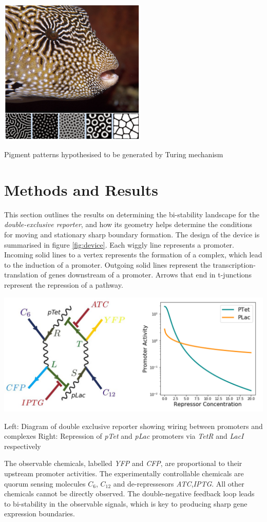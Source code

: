 \begin{Figure}
\includegraphics[width=70mm]{figures/turing.png}
\caption{Pigment patterns hypothesised to be generated by Turing mechanism}
\label{fig:turing}
\end{Figure}

\section{Methods and Results}
This section outlines the results on determining the bi-stability landscape for the
\textit{double-exclusive reporter}, and how its geometry helps determine the conditions for
moving and stationary sharp boundary formation. The design of the device is summarised 
in figure \ref{fig:device}. Each wiggly line represents a promoter. Incoming solid lines
to a vertex represents the formation of a complex, which lead to the induction of a promoter.
Outgoing solid lines represent the transcription-translation of genes downstream of a
promoter. Arrows that end in t-junctions represent the repression of a pathway.

\begin{Figure}
\includegraphics[width=140mm]{figures/device.png}
\caption{Left: Diagram of double exclusive reporter showing wiring between promoters
and complexes Right: Repression of \textit{pTet} and \textit{pLac} promoters via
\textit{TetR} and \textit{LacI} respectively}
\label{fig:device}
\end{Figure}
\noindent
The observable chemicals, labelled \textit{YFP} and \textit{CFP}, are
proportional to their upstream promoter activities. The experimentally controllable chemicals
are quorum sensing molecules $C_6$, $C_{12}$ and de-repressesors \textit{ATC},\textit{IPTG}.
All other chemicals cannot be directly observed. The double-negative feedback loop leads
to bi-stability in the observable signals, which is key to producing sharp gene
expression boundaries.

